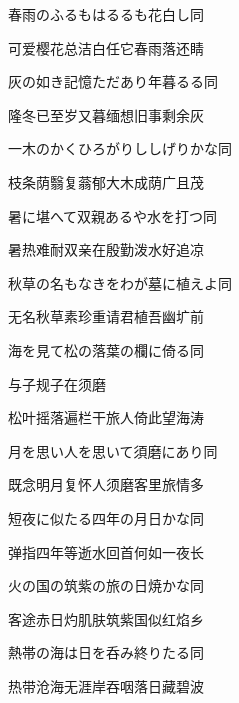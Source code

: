 \begin{haiku}
    {\FH 春雨のふるもはるるも花白し}\hfill{\FH 同}

    {\FK 可爱樱花总洁白任它春雨落还睛}
\end{haiku}

\begin{haiku}
    {\FH 灰の如き記憶ただあり年暮るる}\hfill{\FH 同}

    {\FK 隆冬已至岁又暮缅想旧事剩余灰}
\end{haiku}

\begin{haiku}
    {\FH 一木のかくひろがりししげりかな}\hfill{\FH 同}

    {\FK 枝条荫翳复蓊郁大木成荫广且茂}
\end{haiku}

\begin{haiku}
    {\FH 暑に堪へて双親あるや水を打つ}\hfill{\FH 同}

    {\FK 暑热难耐双亲在殷勤泼水好追凉}
\end{haiku}

\begin{haiku}
    {\FH 秋草の名もなきをわが墓に植えよ}\hfill{\FH 同}

    {\FK 无名秋草素珍重请君植吾幽圹前}
\end{haiku}

\begin{haiku}
    {\FH 海を見て松の落葉の欄に倚る}\hfill{\FH 同}

    {\FK 与子规子在须磨}

    {\FK 松叶摇落遍栏干旅人倚此望海涛}
\end{haiku}

\begin{haiku}
    {\FH 月を思い人を思いて須磨にあり}\hfill{\FH 同}

    {\FK 既念明月复怀人须磨客里旅情多}
\end{haiku}

\begin{haiku}
    {\FH 短夜に似たる四年の月日かな}\hfill{\FH 同}

    {\FK 弹指四年等逝水回首何如一夜长}
\end{haiku}

\begin{haiku}
    {\FH 火の国の筑紫の旅の日焼かな}\hfill{\FH 同}

    {\FK 客途赤日灼肌肤筑紫国似红焰乡}
\end{haiku}

\begin{haiku}
    {\FH 熱帯の海は日を呑み終りたる}\hfill{\FH 同}

    {\FK 热带沧海无涯岸吞咽落日藏碧波}
\end{haiku}

